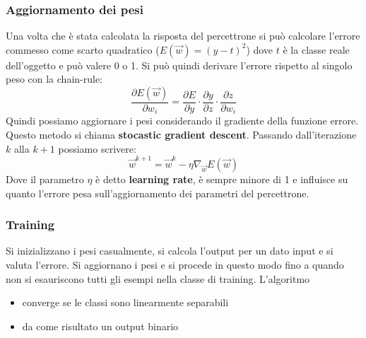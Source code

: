 \subsubsection{Aggiornamento dei pesi}\label{sec:stocastic_gradient_descent}
Una volta che è stata calcolata la risposta del percettrone si può calcolare l'errore commesso come scarto quadratico ($E(\vec{w}) = (y - t)^2$) dove $t$ è la classe reale dell'oggetto e può valere 0 o 1. Si può quindi derivare l'errore rispetto al singolo peso con la chain-rule:
\begin{equation}
	\frac{\partial E(\vec{w})}{\partial w_i} = \frac{\partial E}{\partial y} \cdot\frac{\partial y}{\partial z}\cdot \frac{\partial z}{\partial w_i}
\end{equation}
Quindi possiamo aggiornare i pesi considerando il gradiente della funzione errore. Questo metodo si chiama \textbf{stocastic gradient descent}. Passando dall'iterazione $k$ alla $k+1$ possiamo scrivere:
\begin{equation}
	\vec{w}^{k+1} = \vec{w}^k - \eta \nabla_{\vec{w}} E(\vec{w})
\end{equation}
Dove il parametro $\eta$ è detto \textbf{learning rate}, è sempre minore di 1 e influisce su quanto l'errore pesa sull'aggiornamento dei parametri del percettrone.

\subsubsection{Training}
Si inizializzano i pesi casualmente, si calcola l'output per un dato input e si valuta l'errore. Si aggiornano i pesi e si procede in questo modo fino a quando non si esauriscono tutti gli esempi nella classe di training. L'algoritmo
\begin{itemize}
	\item converge se le classi sono linearmente separabili
	\item da come risultato un output binario
\end{itemize}

